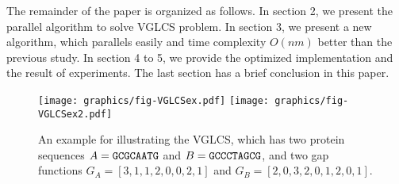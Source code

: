The remainder of the paper is organized as follows. In section 2, we
present the parallel algorithm to solve VGLCS problem. In section 3,
we present a new algorithm, which parallels easily and time complexity
$O(nm)$ better than the previous study. In section 4 to 5, we provide
the optimized implementation and the result of experiments. The last
section has a brief conclusion in this paper.

\iffalse
這一篇論文，我們將在第二 \ref{sec:parallelSerial} 節部分將 Yung-Hsing Peng ~\cite{yunghsing} 提出的算法進行平行化。
在第三節 ~\ref{sec:parallelRMQ}，在理論分析上提供易平行且時間複雜度 $O(nm)$ 的設計。
在第四節 ~\ref{sec:Implementation}，我們將藉由快取忘卻 (cache-oblivious) 技術，在實作上提供更好的效能。最後，我們總結實驗結果與理論實務上的差異。
\fi

\begin{figure}[!thb]
  \centering
  \texttt{[image: graphics/fig-VGLCSex.pdf]}
  \texttt{[image: graphics/fig-VGLCSex2.pdf]}

  \caption{   An example for illustrating the VGLCS, which has two
protein sequences $A = \tt{GCGCAATG}$ and $B = \tt{GCCCTAGCG}$, and
two gap functions $G_A = [3, 1, 1, 2, 0, 0, 2, 1]$ and $G_B = [2, 0,
3, 2, 0, 1, 2, 0, 1]$.   }
  
  \label{fig:VGLCSex}
\end{figure}